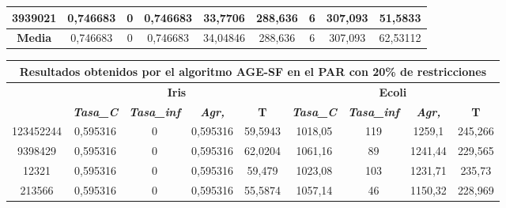 \documentclass[12pt, spanish]{article}
\begin{document}
\begin{table}[H]
\begin{tabular}{|c|c|c|c|c|c|c|c|c|}
3939021           & 0,746683                  & 0                           & 0,746683               & 33,7706    & 288,636                   & 6                           & 307,093                & 51,5833    \\ \hline
\textbf{Media}    & 0,746683                  & 0                           & 0,746683               & 34,04846   & 288,636                   & 6                           & 307,093                & 62,53112   \\ \hline
\end{tabular}
\end{table}



\begin{table}[H]
\footnotesize
\begin{tabular}{|c|c|c|c|c|c|c|c|c|}
\hline
\multicolumn{9}{|c|}{\textbf{Resultados obtenidos por el algoritmo AGE-SF en el PAR con 20\% de restricciones}}                                                                                                   \\ \hline
\multirow{2}{*}{} & \multicolumn{4}{c|}{\textbf{Iris}}                                                            & \multicolumn{4}{c|}{\textbf{Ecoli}}                                                           \\ \cline{2-9} 
                  & \textit{\textbf{Tasa\_C}} & \textit{\textbf{Tasa\_inf}} & \textit{\textbf{Agr,}} & \textbf{T} & \textit{\textbf{Tasa\_C}} & \textit{\textbf{Tasa\_inf}} & \textit{\textbf{Agr,}} & \textbf{T} \\ \hline
123452244         & 0,595316                  & 0                           & 0,595316               & 59,5943    & 1018,05                   & 119                         & 1259,1                 & 245,266    \\ \hline
9398429           & 0,595316                  & 0                           & 0,595316               & 62,0204    & 1061,16                   & 89                          & 1241,44                & 229,565    \\ \hline
12321             & 0,595316                  & 0                           & 0,595316               & 59,479     & 1023,08                   & 103                         & 1231,71                & 235,73     \\ \hline
213566            & 0,595316                  & 0                           & 0,595316               & 55,5874    & 1057,14                   & 46                          & 1150,32                & 228,969    \\ \hline

\end{tabular}
\end{table}
\end{document}
